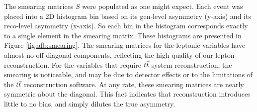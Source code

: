 The smearing matrices $S$ were populated as one might expect. Each event
was placed into a 2D histogram bin based on its gen-level asymmetry
(y-axis) and its reco-level asymmetry (x-axis). So each bin in the
histogram corresponds exactly to a single element in the smearing
matrix. These histograms are presented in Figure \ref{fig:afb:smearing}. The smearing
matrices for the leptonic variables have almost no off-diagonal
components, reflecting the high quality of our lepton
reconstruction. For the variables that require $t\bar{t}$ system
reconstruction, the smearing is noticeable, and may be due to detector
effects or to the limitations of the $t\bar{t}$ reconstruction
software. At any rate, these smearing matrices are nearly symmetric
about the diagonal. This fact indicates that reconstruction introduces
little to no bias, and simply dilutes the true asymmetry.

